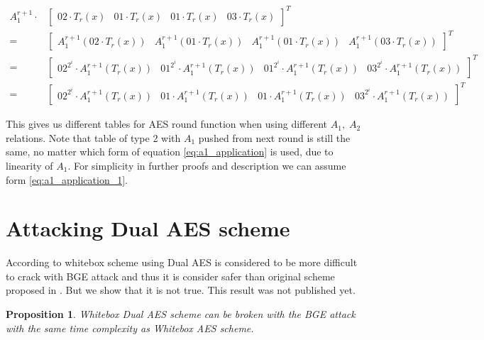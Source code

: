 \documentclass[11pt,oneside,final]{fithesis2}
\newtheorem{myprop}{Proposition}
\begin{document}
	{%
	\begin{subequations}\label{eq:a1_application}
	\begin{align}
	       A_1^{r+1} \cdot &\begin{bmatrix}           02 \cdot T_r(x)        &           01 \cdot T_r(x)        &           01 \cdot T_r(x)        &           03 \cdot T_r(x)        \end{bmatrix}^T \label{eq:a1_application_1} \\
	    =                  &\begin{bmatrix} A_1^{r+1}(02 \cdot T_r(x))       & A_1^{r+1}(01 \cdot T_r(x))       & A_1^{r+1}(01 \cdot T_r(x))       & A_1^{r+1}(03 \cdot T_r(x))       \end{bmatrix}^T \nonumber\\
	    =                  &\begin{bmatrix} 02^{2^i} \cdot A_1^{r+1}(T_r(x)) & 01^{2^i} \cdot A_1^{r+1}(T_r(x)) & 01^{2^i} \cdot A_1^{r+1}(T_r(x)) & 03^{2^i} \cdot A_1^{r+1}(T_r(x)) \end{bmatrix}^T \nonumber\\
	    =                  &\begin{bmatrix} 02^{2^i} \cdot A_1^{r+1}(T_r(x)) & 01 \cdot A_1^{r+1}(T_r(x))       & 01 \cdot A_1^{r+1}(T_r(x))       & 03^{2^i} \cdot A_1^{r+1}(T_r(x)) \end{bmatrix}^T
	\end{align}
	\end{subequations}}
	
	This gives us different tables for AES round function when using different $A_1,\;A_2$ relations. Note that table of type 2 with $A_1$ pushed from next round 
	is still the same, no matter which form of equation \ref{eq:a1_application} is used, due to linearity of $A_1$. 
	For simplicity in further proofs and description we can assume form \ref{eq:a1_application_1}.

    \section{Attacking Dual AES scheme}\label{sec:attacking_dual_aes}
	According to \citep{Karroumi:2010:PWA:2041036.2041060} whitebox scheme using Dual AES is considered to be more difficult to crack with BGE attack and thus it is consider
	safer than original scheme proposed in \citep{Chow02white-boxcryptography}. But we show that it is not true. This result was not published yet.
	
	\begin{myprop}
	Whitebox Dual AES scheme can be broken with the BGE attack with the same time complexity as Whitebox AES scheme.
	\end{myprop}
\end{document}
